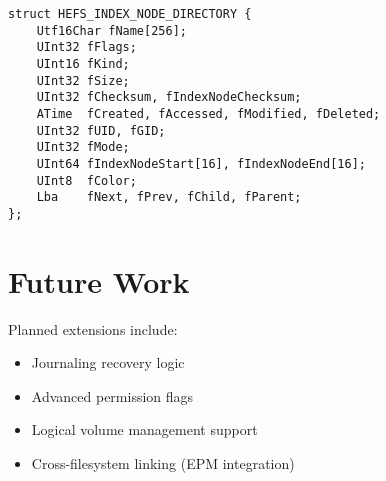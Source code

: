 \documentclass{article}
\begin{document}
\begin{lstlisting}[style=cstyle, caption={HEFS\_INDEX\_NODE\_DIRECTORY structure}]
struct HEFS_INDEX_NODE_DIRECTORY {
    Utf16Char fName[256];
    UInt32 fFlags;
    UInt16 fKind;
    UInt32 fSize;
    UInt32 fChecksum, fIndexNodeChecksum;
    ATime  fCreated, fAccessed, fModified, fDeleted;
    UInt32 fUID, fGID;
    UInt32 fMode;
    UInt64 fIndexNodeStart[16], fIndexNodeEnd[16];
    UInt8  fColor;
    Lba    fNext, fPrev, fChild, fParent;
};
\end{lstlisting}

\section{Future Work}
Planned extensions include:
\begin{itemize}
    \item Journaling recovery logic
    \item Advanced permission flags
    \item Logical volume management support
    \item Cross-filesystem linking (EPM integration)
\end{itemize}
\end{document}
